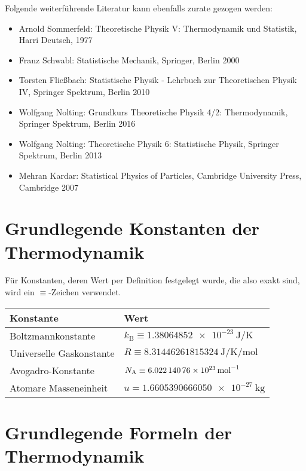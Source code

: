 Folgende weiterführende Literatur kann ebenfalls zurate gezogen werden:
\begin{itemize}
	\item Arnold Sommerfeld: Theoretische Physik V: Thermodynamik und Statistik, Harri Deutsch, 1977
	\item Franz Schwabl: Statistische Mechanik, Springer, Berlin 2000
	\item Torsten Fließbach: Statistische Physik - Lehrbuch zur Theoretischen Physik IV, Springer Spektrum, Berlin 2010
	\item Wolfgang Nolting: Grundkurs Theoretische Physik 4/2: Thermodynamik, Springer Spektrum, Berlin 2016
	\item Wolfgang Nolting: Theoretische Physik 6: Statistische Physik, Springer Spektrum, Berlin 2013
	\item Mehran Kardar: Statistical Physics of Particles, Cambridge University Press, Cambridge 2007
\end{itemize}



\section*{Grundlegende Konstanten der Thermodynamik}

Für Konstanten, deren Wert per Definition festgelegt wurde, die also exakt sind, wird ein $\equiv $-Zeichen verwendet.


\begin{table}[H]
	\centering
	\begin{tabular}{|l|l|} \hline
		\textbf{Konstante}       & \textbf{Wert}                                                                            \\
		\hline

		Boltzmannkonstante       & \centering\arraybackslash{} $k_\mathrm{B} \equiv \qty{1,38064852e-23}{\joule\per\kelvin}$ \\
		Universelle Gaskonstante & \centering\arraybackslash{} $R \equiv \qty{8,31446261815324}{\joule\per\kelvin\per\mole}$ \\
		Avogadro-Konstante        & \centering\arraybackslash{} $N_\mathrm{A} \equiv \qty{6,02214076e23}{\per\mole}$          \\
		Atomare Masseneinheit    & \centering\arraybackslash{} $u= \qty{1,6605390666050e-27}{\kg}$                           \\
		\hline
	\end{tabular}
\end{table}




\section*{Grundlegende Formeln der Thermodynamik}
